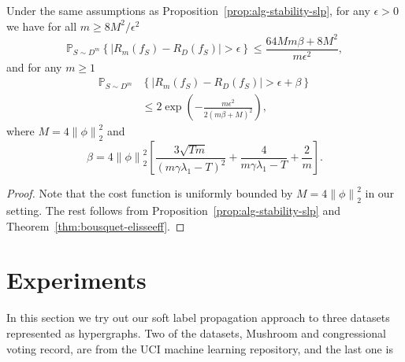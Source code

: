 \documentclass[letterpaper]{article} %
\begin{document}
\begin{theorem}
  Under the same assumptions as Proposition~\ref{prop:alg-stability-slp}, for any $\epsilon>0$ we have for all $m\geq 8M^2/\epsilon^2$
  \begin{equation}
    \label{eq:fraction-bounds-1}
    \mathbb{P}_{S\sim D^m} \left\{ \left| R_m \left( f_S \right)-R_D \left( f_S \right) \right| > \epsilon\right\}\leq \frac{64 Mm\beta+8M^2}{m\epsilon^2},
  \end{equation}
  and for any $m\geq 1$
  \begin{equation}
    \label{eq:exponential-bounds-1}
    \begin{aligned}
    \mathbb{P}_{S\sim D^m}&\left\{ \left| R_m \left( f_S \right)-R_D \left( f_S \right) \right| > \epsilon+\beta\right\}\\
    &\leq 2\exp \left( -\frac{m\epsilon^2}{2 \left( m\beta+M \right)^2} \right),
    \end{aligned}
  \end{equation}
  where $M=4\left\| \phi \right\|_2^2$ and
  \begin{equation*}
    \beta=4\left\| \phi \right\|_2^2\left[\frac{3\sqrt{Tm}}{\left( m\gamma\lambda_1-T \right)^2}+\frac{4}{m\gamma\lambda_1-T}+\frac{2}{m}\right].
  \end{equation*}
\end{theorem}

\begin{proof}
  Note that the cost function is uniformly bounded by $M=4 \left\| \phi \right\|_2^2$ in our setting. The rest follows from Proposition~\ref{prop:alg-stability-slp} and Theorem~\ref{thm:bousquet-elisseeff}.
\end{proof}









	




\section{Experiments}
In this section we try out our soft label propagation approach to three datasets represented as hypergraphs. Two of the datasets, Mushroom and congressional voting record, are from the UCI machine learning repository, and the last one is 
\end{document}
